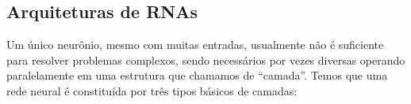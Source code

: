 \documentclass{automatextcc}
\begin{document}
\subsection{Arquiteturas de RNAs}


Um único neurônio, mesmo com muitas entradas, usualmente não é suficiente para resolver problemas complexos, sendo necessários por vezes diversas operando paralelamente em uma estrutura que chamamos de ``camada''. Temos que uma rede neural é constituída por três tipos básicos de camadas:
\end{document}

